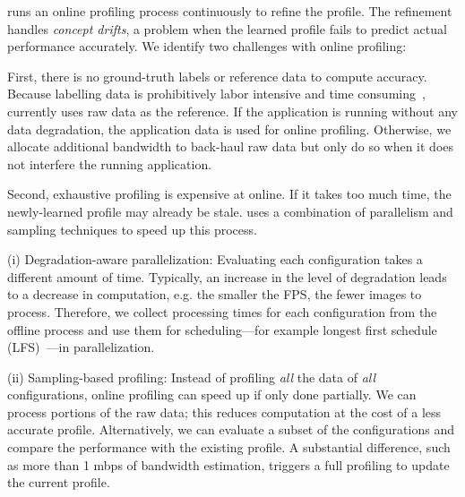  \sysname{} runs an online profiling process
continuously to refine the profile. The refinement handles \textit{concept
  drifts}, a problem when the learned profile fails to predict actual
performance accurately. We identify two challenges with online profiling:

First, there is no ground-truth labels or reference data to compute
accuracy. Because labelling data is prohibitively labor intensive and time
consuming~\cite{russell2008labelme}, \sysname{} currently uses raw data as the
reference. If the application is running without any data degradation, the
application data is used for online profiling. Otherwise, we allocate additional
bandwidth to back-haul raw data but only do so when it does not interfere the
running application.

Second, exhaustive profiling is expensive at online. If it takes too much time,
the newly-learned profile may already be stale. \sysname{} uses a combination of
parallelism and sampling techniques to speed up this process.

(i) Degradation-aware parallelization: Evaluating each configuration takes a
different amount of time. Typically, an increase in the level of degradation
leads to a decrease in computation, e.g. the smaller the FPS, the fewer images
to process. Therefore, we collect processing times for each configuration from
the offline process and use them for scheduling---for example longest first
schedule (LFS)~\cite{karger2010scheduling}---in parallelization.

(ii) Sampling-based profiling: Instead of profiling \textit{all} the data of
\textit{all} configurations, online profiling can speed up if only done
partially. We can process portions of the raw data; this reduces computation at
the cost of a less accurate profile. Alternatively, we can evaluate a subset of
the configurations and compare the performance with the existing profile. A
substantial difference, such as more than 1 mbps of bandwidth estimation,
triggers a full profiling to update the current profile.

